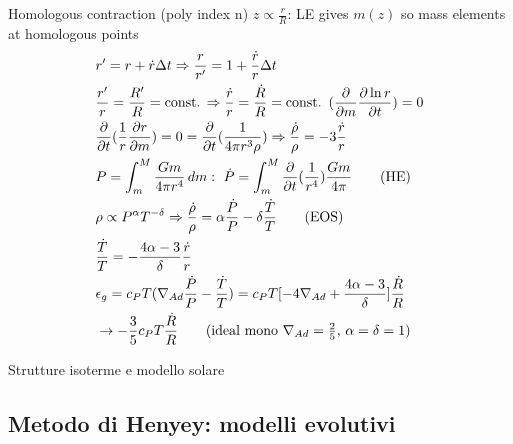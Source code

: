 \begin{frame}{Homologous contraction (poly index n)}
$z\propto\frac{r}{R}$: LE gives $m(z)$ so mass elements at homologous points
\begin{align*}
&r'=r+\dot{r}\Delta t\Rightarrow\frac{r}{r'}=1+\frac{\dot{r}}{r}\Delta t\\
&\frac{r'}{r}=\frac{R'}{R}=\const{}\Rightarrow\frac{\dot{r}}{r}=\frac{\dot{R}}{R}=\const{}\ (\PDof{m}\PDy{t}{\ln{r}})=0\\
&\PDof{t}(\frac{1}{r}\PDy{m}{r})=0=\PDof{t}(\frac{1}{4\pi r^3\rho})\Rightarrow\frac{\dot{\rho}}{\rho}=-3\frac{\dot{r}}{r}\\
&P=\int_m^M\frac{Gm}{4\pi r^4}\,dm:\ \dot{P}=\int_m^M\PDof{t}(\frac{1}{r^4})\frac{Gm}{4\pi}\tag{HE}\\
&\rho\propto P^{\alpha}T^{-\delta}\Rightarrow\frac{\dot{\rho}}{\rho}=\alpha\frac{\dot{P}}{P}-\delta\frac{\dot{T}}{T}\tag{EOS}\\
&\frac{\dot{T}}{T}=-\frac{4\alpha-3}{\delta}\frac{\dot{r}}{r}\\
&\epsilon_g=c_PT(\nad\frac{\dot{P}}{P}-\frac{\dot{T}}{T})=c_PT[-4\nad+\frac{4\alpha-3}{\delta}]\frac{\dot{R}}{R}\\
&\to-\frac{3}{5}c_PT\frac{\dot{R}}{R}\tag{ideal mono $\nad=\frac{2}{5}$, $\alpha=\delta=1$}
\end{align*}

\end{frame}

\begin{frame}{Strutture isoterme e modello solare}
	
\end{frame}

\subsection{Metodo di Henyey: modelli evolutivi}

